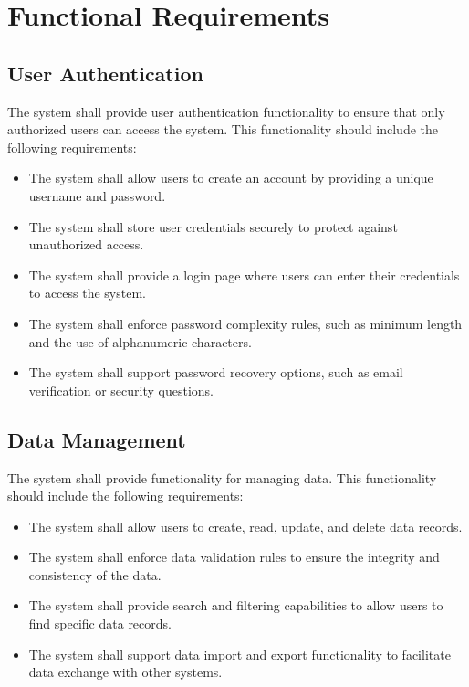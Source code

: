 
\section{Functional Requirements}

\subsection{User Authentication}
The system shall provide user authentication functionality to ensure that only authorized users can access the system. This functionality should include the following requirements:

\begin{itemize}
    \item The system shall allow users to create an account by providing a unique username and password.
    \item The system shall store user credentials securely to protect against unauthorized access.
    \item The system shall provide a login page where users can enter their credentials to access the system.
    \item The system shall enforce password complexity rules, such as minimum length and the use of alphanumeric characters.
    \item The system shall support password recovery options, such as email verification or security questions.
\end{itemize}

\subsection{Data Management}
The system shall provide functionality for managing data. This functionality should include the following requirements:

\begin{itemize}
    \item The system shall allow users to create, read, update, and delete data records.
    \item The system shall enforce data validation rules to ensure the integrity and consistency of the data.
    \item The system shall provide search and filtering capabilities to allow users to find specific data records.
    \item The system shall support data import and export functionality to facilitate data exchange with other systems.
\end{itemize}

